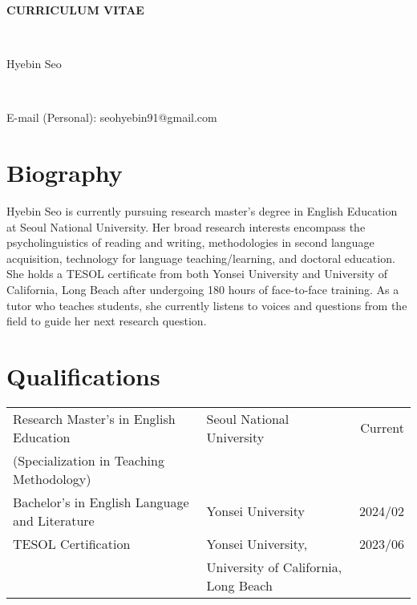 \documentclass[11pt]{article}
\begin{document}
\begin{center}
	\begin{huge}\textbf{CURRICULUM VITAE}\end{huge}\\[0.2cm]
    \begin{large}Hyebin Seo\end{large}\\[0.2cm]
    \begin{small}
    E-mail (Personal): seohyebin91@gmail.com\\
    \end{small}
\end{center}

\section{Biography} %
Hyebin Seo is currently pursuing research master's degree in English Education at Seoul National University. Her broad research interests encompass the psycholinguistics of reading and writing, methodologies in second language acquisition, technology for language teaching/learning, and doctoral education. She holds a TESOL certificate from both Yonsei University and University of California, Long Beach after undergoing 180 hours of face-to-face training. As a tutor who teaches students, she currently listens to voices and questions from the field to guide her next research question. 
\vspace{0.8cm}

\section{Qualifications}
\begin{tabularx}{\textwidth}{X p{8cm} r}
Research Master's in English Education & Seoul National University & Current\\ [-3pt](Specialization in Teaching Methodology) & &\\
Bachelor's in English Language and Literature & Yonsei University & 2024/02\\
TESOL Certification & Yonsei University, & 2023/06\\[-3pt] & University of California, Long Beach & \\  
\end{tabularx}
\vspace{0.8cm}
\end{document}
